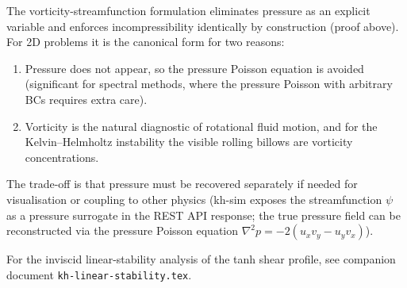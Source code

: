 \documentclass[11pt,a4paper]{article}
\theoremstyle{definition}
\theoremstyle{plain}
\begin{document}
The vorticity-streamfunction formulation eliminates pressure as an
explicit variable and enforces incompressibility identically by
construction (proof above). For 2D problems it is the canonical form
for two reasons:
\begin{enumerate}
\item Pressure does not appear, so the pressure Poisson equation is
      avoided (significant for spectral methods, where the pressure
      Poisson with arbitrary BCs requires extra care).
\item Vorticity is the natural diagnostic of rotational fluid motion,
      and for the Kelvin--Helmholtz instability the visible rolling
      billows are vorticity concentrations.
\end{enumerate}
The trade-off is that pressure must be recovered separately if needed
for visualisation or coupling to other physics (kh-sim exposes the
streamfunction $\psi$ as a pressure surrogate in the REST API
response; the true pressure field can be reconstructed via the
pressure Poisson equation $\nabla^2 p = -2(u_x v_y - u_y v_x)$).

For the inviscid linear-stability analysis of the tanh shear profile,
see companion document \texttt{kh-linear-stability.tex}.

\printbibliography
\end{document}
